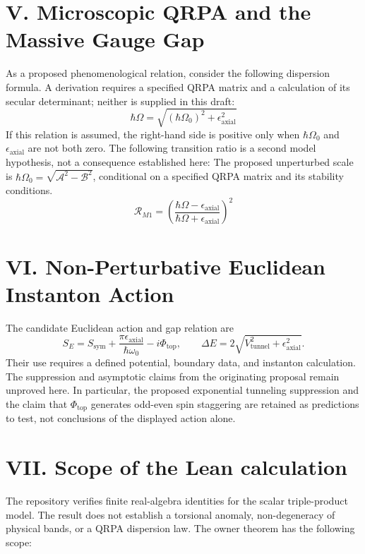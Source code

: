 \documentclass[aps,prl,reprint,superscriptaddress,nofootinbib,amsmath,amssymb]{revtex4-2}
\begin{document}
\section{V. Microscopic QRPA and the Massive Gauge Gap}
As a proposed phenomenological relation, consider the following dispersion formula. A derivation requires a specified QRPA matrix and a calculation of its secular determinant; neither is supplied in this draft:
\begin{equation}
\hbar\Omega = \sqrt{(\hbar\Omega_0)^2 + \epsilon_{\text{axial}}^2}
\end{equation}
If this relation is assumed, the right-hand side is positive only when $\hbar\Omega_0$ and $\epsilon_{\text{axial}}$ are not both zero. The following transition ratio is a second model hypothesis, not a consequence established here:
The proposed unperturbed scale is $\hbar\Omega_0=\sqrt{\mathcal A^2-\mathcal B^2}$, conditional on a specified QRPA matrix and its stability conditions.
\begin{equation}
\mathcal{R}_{M1} = \left( \frac{\hbar\Omega - \epsilon_{\text{axial}}}{\hbar\Omega + \epsilon_{\text{axial}}} \right)^2
\end{equation}

\section{VI. Non-Perturbative Euclidean Instanton Action}
The candidate Euclidean action and gap relation are
\begin{equation}
S_E = S_{\text{sym}} + \frac{\pi \epsilon_{\text{axial}}}{\hbar\omega_0} - i \Phi_{\text{top}}, \qquad
\Delta E = 2\sqrt{V_{\text{tunnel}}^2 + \epsilon_{\text{axial}}^2}.
\end{equation}
Their use requires a defined potential, boundary data, and instanton calculation. The suppression and asymptotic claims from the originating proposal remain unproved here.
In particular, the proposed exponential tunneling suppression and the claim that $\Phi_{\text{top}}$ generates odd-even spin staggering are retained as predictions to test, not conclusions of the displayed action alone.

\section{VII. Scope of the Lean calculation}
The repository verifies finite real-algebra identities for the scalar triple-product model. The result does not establish a torsional anomaly, non-degeneracy of physical bands, or a QRPA dispersion law. The owner theorem has the following scope:
\end{document}
